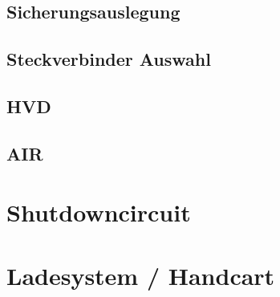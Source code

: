 \subsection{Sicherungsauslegung}

\subsection{Steckverbinder Auswahl}

\subsection{HVD}

\subsection{AIR}

\section{Shutdowncircuit}

\section{Ladesystem / Handcart}

